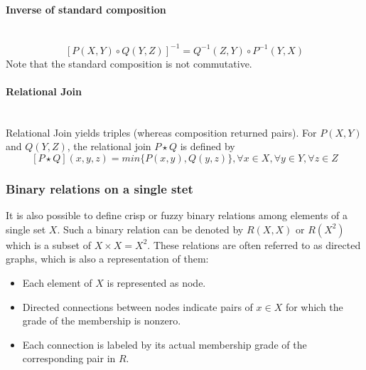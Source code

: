 \documentclass{article}
\begin{document}
\paragraph{Inverse of standard composition}\mbox{}\\
$$[P(X,Y)\circ Q(Y,Z)]^{-1}=Q^{-1}(Z,Y)\circ P^{-1}(Y,X)$$
Note that the standard composition is not commutative.

\paragraph{Relational Join}\mbox{}\\
Relational Join yields triples (whereas composition returned pairs). For $P(X,Y)$ and
$Q(Y,Z)$, the relational join $P\star Q$ is defined by
$$[P\star Q](x,y,z)=min\{P(x,y),Q(y,z)\}, \forall x \in X, \forall y \in Y,\forall z\in Z$$

\subsubsection{Binary relations on a single stet}
It is also possible to define crisp or fuzzy binary relations among elements of a single set $X$.
Such a binary relation can be denoted by $R(X,X)$ or $R(X^2)$ which is a subset of $X\times X=X^2$.
\newline\newline
These relations are often referred to as directed graphs, which is also a representation of them:
\begin{itemize}
    \item Each element of $X$ is represented as node.
    \item Directed connections between nodes indicate pairs of $x\in X$ for which the grade
          of the membership is nonzero.
    \item Each connection is labeled by its actual membership grade of the corresponding pair
          in $R$.
\end{itemize}
\end{document}
